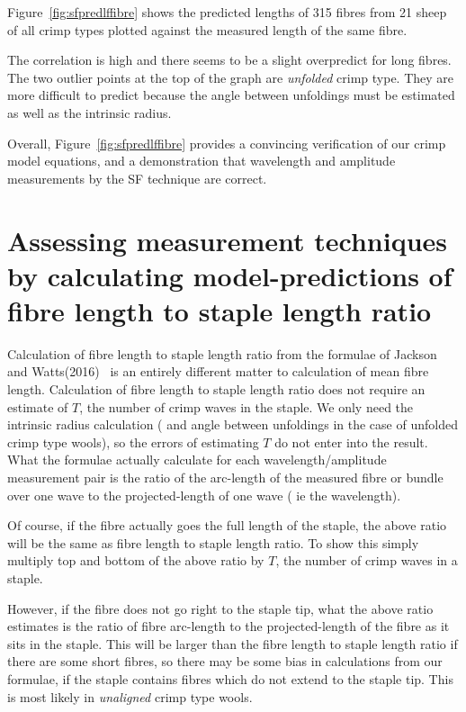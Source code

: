 \documentclass[titlepage,10pt]{article}  %
\begin{document}
 Figure~\ref{fig:sfpredlffibre} shows the predicted lengths of 315 fibres from 21 sheep of all crimp types plotted against the measured length of the same fibre.


The correlation is high and there seems to be a slight overpredict for long fibres. The two outlier points at the top of the graph are {\em unfolded} crimp type. They are more difficult to predict because the angle between unfoldings must be estimated as well as the intrinsic radius.  

 Overall, Figure~\ref{fig:sfpredlffibre} provides a convincing verification of our crimp model equations, and a demonstration that wavelength and amplitude measurements by the SF technique are correct.  

\clearpage
\section{Assessing measurement techniques by calculating model-predictions of fibre length to staple length ratio}

 Calculation of fibre length to staple length ratio from the formulae of Jackson and Watts(2016)~\cite{jack:16} is an entirely different matter to calculation of mean fibre length. Calculation of fibre length to staple length ratio does not require an estimate of $T$, the number of crimp waves in the staple. We only need the intrinsic radius calculation ( and angle between unfoldings in the case of unfolded crimp type wools), so the errors of estimating $T$ do not enter into the result. What the formulae actually calculate for each wavelength/amplitude measurement pair is the ratio of the arc-length of the measured fibre or bundle over one wave to the projected-length of one wave ( ie the wavelength). 

 Of course, if the fibre actually goes the full length of the staple, the above ratio will be the same as fibre length to staple length ratio. To show this simply multiply top and bottom of the above ratio by $T$, the number of crimp waves in a staple.

 However, if the fibre does not go right to the staple tip, what the above ratio estimates is the ratio of fibre arc-length to the projected-length of the fibre as it sits in the staple.  This will be larger than the fibre length to staple length ratio if there are some short fibres, so there may be some bias in calculations from our formulae, if the staple contains fibres which do not extend to the staple tip. This is most likely in {\em unaligned} crimp type wools.
\end{document}
